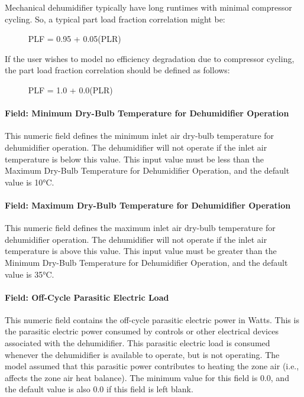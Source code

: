 Mechanical dehumidifier typically have long runtimes with minimal compressor cycling. So, a typical part load fraction correlation might be:

~~~~~ PLF = 0.95 + 0.05(PLR)

If the user wishes to model no efficiency degradation due to compressor cycling, the part load fraction correlation should be defined as follows:

~~~~~ PLF = 1.0 + 0.0(PLR)

\paragraph{Field: Minimum Dry-Bulb Temperature for Dehumidifier Operation}\label{field-minimum-dry-bulb-temperature-for-dehumidifier-operation}

This numeric field defines the minimum inlet air dry-bulb temperature for dehumidifier operation. The dehumidifier will not operate if the inlet air temperature is below this value. This input value must be less than the Maximum Dry-Bulb Temperature for Dehumidifier Operation, and the default value is 10°C.

\paragraph{Field: Maximum Dry-Bulb Temperature for Dehumidifier Operation}\label{field-maximum-dry-bulb-temperature-for-dehumidifier-operation}

This numeric field defines the maximum inlet air dry-bulb temperature for dehumidifier operation. The dehumidifier will not operate if the inlet air temperature is above this value. This input value must be greater than the Minimum Dry-Bulb Temperature for Dehumidifier Operation, and the default value is 35°C.

\paragraph{Field: Off-Cycle Parasitic Electric Load}\label{field-off-cycle-parasitic-electric-load-001}

This numeric field contains the off-cycle parasitic electric power in Watts. This is the parasitic electric power consumed by controls or other electrical devices associated with the dehumidifier. This parasitic electric load is consumed whenever the dehumidifier is available to operate, but is not operating. The model assumed that this parasitic power contributes to heating the zone air (i.e., affects the zone air heat balance). The minimum value for this field is 0.0, and the default value is also 0.0 if this field is left blank.

